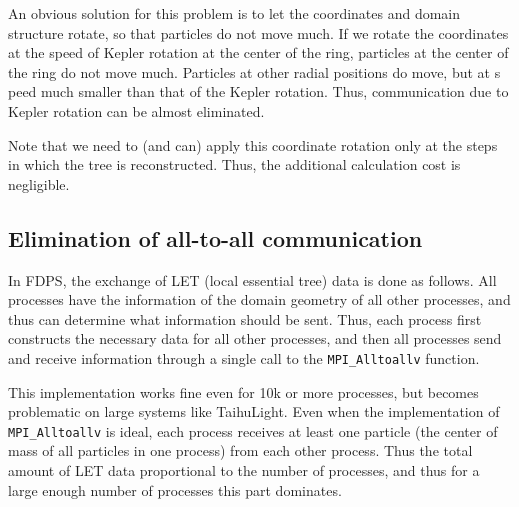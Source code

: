 \documentclass[oribibl]{llncs}
\begin{document}
An obvious solution for this problem is to let the coordinates and domain
structure rotate, so that particles do not move much. If we rotate the
coordinates at the speed of Kepler rotation at the center of the ring,
particles at the center of the ring do not move much. Particles at
other radial positions do move, but at s peed much smaller than
that of the Kepler rotation. Thus, communication due to Kepler
rotation can be almost eliminated.

Note that we need to (and can) apply this coordinate rotation only at
the steps in which the tree is reconstructed. Thus, the additional
calculation cost is negligible.

\subsection{Elimination of all-to-all communication}
\label{subsec:exlet}



In FDPS, the exchange of LET (local essential tree) data is done as
follows. All processes have the information of the domain geometry of
all other processes, and thus can determine what information should be
sent. Thus, each process first constructs the necessary data for all
other processes, and then all processes send and receive information
through a single call to the {\tt MPI\_Alltoallv} function.

This implementation works fine even for 10k or more processes, but
becomes problematic on large systems like TaihuLight. Even when the
implementation of {\tt MPI\_Alltoallv} is ideal, each process
receives at least one particle (the center of mass of all particles in
one process) from each other process. Thus the total amount of LET
data proportional to the number of processes, and thus
for a large enough number of processes this part dominates.
\end{document}
